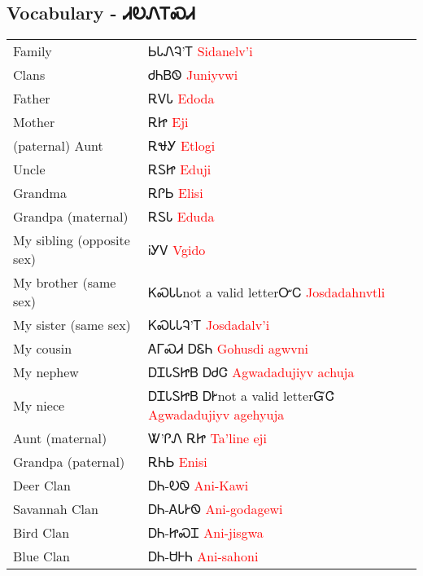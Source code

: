 \begin{multicols}
\newpage\subsection{Vocabulary - ᏗᎧᏁᎢᏍᏗ 
}
\begin{minipage}{\linewidth}
\begin{tabular}{p{5cm} p{9cm}}
Family & ᏏᏓᏁᎸ’Ꭲ 
 \newline \textcolor{red}{Sidanelv’i}\\
Clans & ᏧᏂᏴᏫ 
 \newline \textcolor{red}{Juniyvwi}\\
Father & ᎡᏙᏓ 
 \newline \textcolor{red}{Edoda}\\
Mother & ᎡᏥ 
 \newline \textcolor{red}{Eji}\\
(paternal) Aunt & ᎡᏠᎩ 
 \newline \textcolor{red}{Etlogi}\\
Uncle & ᎡᏚᏥ 
 \newline \textcolor{red}{Eduji}\\
Grandma & ᎡᎵᏏ 
 \newline \textcolor{red}{Elisi}\\
Grandpa (maternal) & ᎡᏚᏓ 
 \newline \textcolor{red}{Eduda}\\
My sibling (opposite sex) & ᎥᎩᏙ 
 \newline \textcolor{red}{Vgido}\\
My brother (same sex) & ᏦᏍᏓᏓnot a valid letterᏅᏟ 
 \newline \textcolor{red}{Josdadahnvtli}\\
My sister (same sex) & ᏦᏍᏓᏓᎸ’Ꭲ 
 \newline \textcolor{red}{Josdadalv’i}\\
My cousin & ᎪᎱᏍᏗ ᎠᏋᏂ 
 \newline \textcolor{red}{Gohusdi agwvni}\\
My nephew & ᎠᏆᏓᏚᏥᏴ ᎠᏧᏣ 
 \newline \textcolor{red}{Agwadadujiyv achuja}\\
My niece & ᎠᏆᏓᏚᏥᏴ ᎠᎨnot a valid letterᏳᏣ 
 \newline \textcolor{red}{Agwadadujiyv agehyuja}\\
Aunt (maternal) & Ꮤ’ᎵᏁ ᎡᏥ 
 \newline \textcolor{red}{Ta’line eji}\\
Grandpa (paternal) & ᎡᏂᏏ 
 \newline \textcolor{red}{Enisi}\\
Deer Clan & ᎠᏂ-ᎧᏫ 
 \newline \textcolor{red}{Ani-Kawi}\\
Savannah Clan & ᎠᏂ-ᎪᏓᎨᏫ 
 \newline \textcolor{red}{Ani-godagewi}\\
Bird Clan & ᎠᏂ-ᏥᏍᏆ 
 \newline \textcolor{red}{Ani-jisgwa}\\
Blue Clan & ᎠᏂ-ᏌᎰᏂ 
 \newline \textcolor{red}{Ani-sahoni}\\
\end{tabular}
\end{minipage}


\end{multicols}
